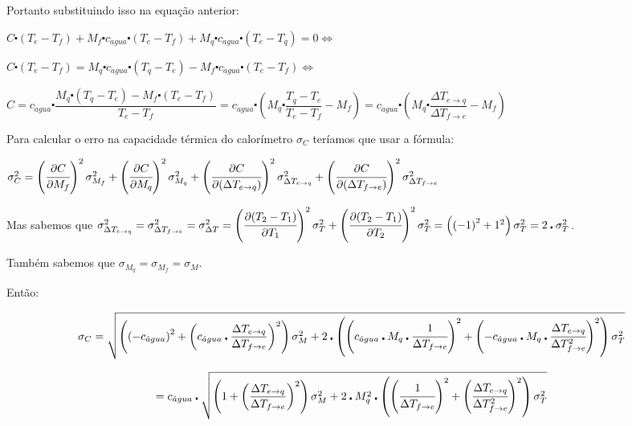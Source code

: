 \documentclass[a4paper]{article}
\begin{document}
			Portanto substituindo isso na equação anterior:

			$C\centerdot(T_{e}-T_{f})+M_{f}\centerdot c_{\acute{a}gua}\centerdot(T_{e}-T_{f})+M_{q}\centerdot c_{\acute{a}gua}\centerdot(T_{e}-T_{q})=0\Longleftrightarrow$

			$C\centerdot(T_{e}-T_{f})=M_{q}\centerdot c_{\acute{a}gua}\centerdot(T_{q}-T_{e})-M_{f}\centerdot c_{\acute{a}gua}\centerdot(T_{e}-T_{f})\Longleftrightarrow$

			$C=c_{\acute{a}gua}\centerdot\dfrac{M_{q}\centerdot(T_{q}-T_{e})-M_{f}\centerdot(T_{e}-T_{f})}{T_{e}-T_{f}}=c_{\acute{a}gua}\centerdot\left(M_{q}\centerdot\dfrac{T_{q}-T_{e}}{T_{e}-T_{f}}-M_{f}\right)=c_{\acute{a}gua}\centerdot\left(M_{q}\centerdot\dfrac{\Delta T_{e\rightarrow q}}{\Delta T_{f\rightarrow e}}-M_{f}\right)$

			Para calcular o erro na capacidade térmica do calorímetro $\sigma_{C}$
			teríamos que usar a fórmula:

			$\sigma_{C}^{2}=\left(\cfrac{\partial C}{\partial M_{f}}\right)^{2}\sigma_{M_{f}}^{2}+\left(\cfrac{\partial C}{\partial M_{q}}\right)^{2}\sigma_{M_{q}}^{2}+\left(\cfrac{\partial C}{\partial(\Delta T_{e\rightarrow q})}\right)^{2}\sigma_{\Delta T_{e\rightarrow q}}^{2}+\left(\cfrac{\partial C}{\partial(\Delta T_{f\rightarrow e})}\right)^{2}\sigma_{\Delta T_{f\rightarrow e}}^{2}$

			Mas sabemos que $\sigma_{\Delta T_{e\rightarrow q}}^{2}=\sigma_{\Delta T_{f\rightarrow e}}^{2}=\sigma_{\Delta T}^{2}=\left(\cfrac{\partial(T_{2}-T_{1})}{\partial T_{1}}\right)^{2}\sigma_{T}^{2}+\left(\cfrac{\partial(T_{2}-T_{1})}{\partial T_{2}}\right)^{2}\sigma_{T}^{2}=\left(\left(-1\right)^{2}+1^{2}\right)\sigma_{T}^{2}=2\centerdot\sigma_{T}^{2}$.

			Também sabemos que $\sigma_{M_{q}}=\sigma_{M_{f}}=\sigma_{M}$.

			Então:

			\[
				\sigma_{C}=\sqrt{\left(\left(-c_{\acute{a}gua}\right)^{2}+\left(c_{\acute{a}gua}\centerdot\dfrac{\Delta T_{e\rightarrow q}}{\Delta T_{f\rightarrow e}}\right)^{2}\right)\sigma_{M}^{2}+2\centerdot\left(\left(c_{\acute{a}gua}\centerdot M_{q}\centerdot\cfrac{1}{\Delta T_{f\rightarrow e}}\right)^{2}+\left(-c_{\acute{a}gua}\centerdot M_{q}\centerdot\cfrac{\Delta T_{e\rightarrow q}}{\Delta T_{f\rightarrow e}^{2}}\right)^{2}\right)\sigma_{T}^{2}}
			\]


			\[
				=c_{\acute{a}gua}\centerdot\sqrt{\left(1+\left(\dfrac{\Delta T_{e\rightarrow q}}{\Delta T_{f\rightarrow e}}\right)^{2}\right)\sigma_{M}^{2}+2\centerdot M_{q}^{2}\centerdot\left(\left(\cfrac{1}{\Delta T_{f\rightarrow e}}\right)^{2}+\left(\cfrac{\Delta T_{e\rightarrow q}}{\Delta T_{f\rightarrow e}^{2}}\right)^{2}\right)\sigma_{T}^{2}}
			\]
\end{document}
